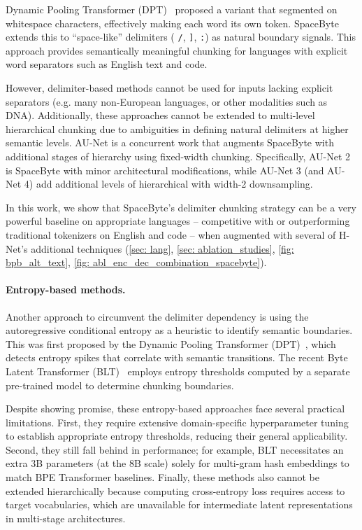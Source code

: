 Dynamic Pooling Transformer (DPT)~\citep{DPT} proposed a variant that segmented on whitespace characters, effectively making each word its own token.
SpaceByte~\citep{SpaceByte} extends this to ``space-like'' delimiters (\eg{} \texttt{/}, \texttt{]}, \texttt{:}) as natural boundary signals. 
This approach provides semantically meaningful chunking for languages with explicit word separators such as English text and code.

However, delimiter-based methods cannot be used for inputs lacking explicit separators (e.g. many non-European languages, or other modalities such as DNA). 
Additionally, these approaches cannot be extended to multi-level hierarchical chunking due to ambiguities in defining natural delimiters at higher semantic levels.
AU-Net \citep{AUNet} is a concurrent work that augments SpaceByte with additional stages of hierarchy using fixed-width chunking.
Specifically, AU-Net 2 is SpaceByte with minor architectural modifications, while AU-Net 3 (and AU-Net 4) add additional levels of hierarchical with width-2 downsampling.

In this work, we show that SpaceByte's delimiter chunking strategy can be a very powerful baseline on appropriate languages -- competitive with or outperforming traditional tokenizers on English and code -- when augmented with several of H-Net's additional techniques (\cref{sec: lang}, \cref{sec: ablation_studies}, \cref{fig: bpb_alt_text}, \cref{fig: abl_enc_dec_combination_spacebyte}).

\paragraph{Entropy-based methods.}
Another approach to circumvent the delimiter dependency is using the autoregressive conditional entropy as a heuristic to identify semantic boundaries.
This was first proposed by the Dynamic Pooling Transformer (DPT)~\citep{DPT}, which detects entropy spikes that correlate with semantic transitions.
The recent Byte Latent Transformer (BLT)~\citep{BLT} employs entropy thresholds computed by a separate pre-trained model to determine chunking boundaries.

Despite showing promise, these entropy-based approaches face several practical limitations.
First, they require extensive domain-specific hyperparameter tuning to establish appropriate entropy thresholds, reducing their general applicability.
Second, they still fall behind in performance; for example, BLT necessitates an extra 3B parameters (at the 8B scale) solely for multi-gram hash embeddings to match BPE Transformer baselines.
Finally, these methods also cannot be extended hierarchically because computing cross-entropy loss requires access to target vocabularies, which are unavailable for intermediate latent representations in multi-stage architectures.

